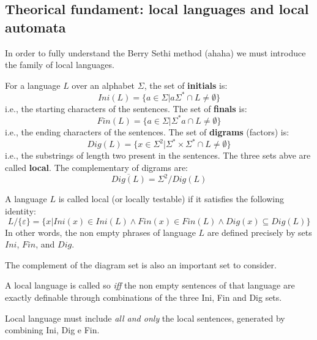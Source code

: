 		\subsection{Theorical fundament: local languages and local automata}
			In order to fully understand the Berry Sethi method (ahaha) we must introduce the family of local languages.
			\begin{definition}
				For a language $L$ over an alphabet $\Sigma$, the set of \textbf{initials} is:
				$$Ini(L)=\lbrace a\in\Sigma\vert a\Sigma^*\cap L\neq\emptyset\rbrace$$
				i.e., the starting characters of the sentences. The set of \textbf{finals} is:
				$$Fin(L)=\lbrace a\in\Sigma\vert \Sigma^* a\cap L\neq\emptyset\rbrace$$
				i.e., the ending characters of the sentences. The set of \textbf{digrams} (factors) is:
				$$Dig(L)=\lbrace x\in\Sigma^2\vert\Sigma^*\times\Sigma^*\cap L\neq\emptyset\rbrace$$
				i.e., the substrings of length two present in the sentences. The three sets abve are called \textbf{local}.
				The complementary of digrams are:
				$$\overline{Dig(L)}=\Sigma^2/Dig(L)$$
			\end{definition}

			\begin{definition}
				A language $L$ is called local (or locally testable) if it satisfies the following identity:
				$$L/\lbrace\varepsilon\rbrace =\lbrace x\vert Ini(x)\in Ini(L)\wedge Fin(x)\in Fin(L)\wedge Dig(x)\subseteq Dig(L)\rbrace$$
				In other words, the non empty phrases of language $L$ are defined precisely by sets $Ini$, $Fin$, and $Dig$.
			\end{definition}


			The complement of the diagram set is also an important set to consider.\\
			\begin{corollary}
				A local language is called so \emph{iff} the non empty sentences of that language are exactly definable through combinations of the three Ini, Fin and Dig sets.
			\end{corollary}
			\begin{corollary}
				Local language must include \emph{all and only} the local sentences, generated by combining Ini, Dig e Fin.
			\end{corollary}

